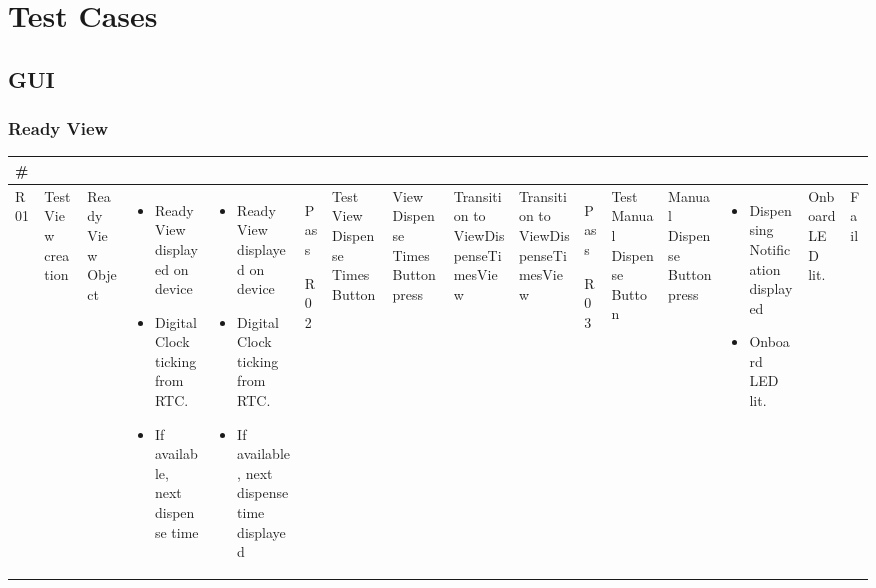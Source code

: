\documentclass[12pt]{article}
\begin{document}
\pagebreak
\section{Test Cases}

\subsection{GUI}

\subsubsection{Ready View}
\begin{tabularx}{\textwidth}{|X|X|X|p{}|p{}|X|}
        \hline
         \#     &      &       &   &     &    \\
        \hline

        R01 & Test View creation & Ready View Object & 
        \begin{itemize}[leftmargin=*,topsep=0ex,parsep=0pt]
            \item Ready View displayed on device
            \item Digital Clock ticking from RTC.
            \item If available, next dispense time
        \end{itemize} & 
        \begin{itemize}[leftmargin=*,topsep=0ex,parsep=0pt]
            \item Ready View displayed on device
            \item Digital Clock ticking from RTC.
            \item If available, next dispense time displayed
        \end{itemize} & Pass
        
        \hline
        
        \hline

        R02 & Test View Dispense Times Button & View Dispense Times Button press & Transition to ViewDispenseTimesView & Transition to ViewDispenseTimesView & Pass
        
        \hline
        
        \hline

        R03 & Test Manual Dispense Button & Manual Dispense Button press & 
        \begin{itemize}[leftmargin=*,topsep=0ex,parsep=0pt]
            \item Dispensing Notification displayed
            \item Onboard LED lit.
        \end{itemize} & 
        Onboard LED lit. & Fail
        
        \hline
    \caption{Ready View Test Cases} %
    \end{tabularx}
\end{document}
